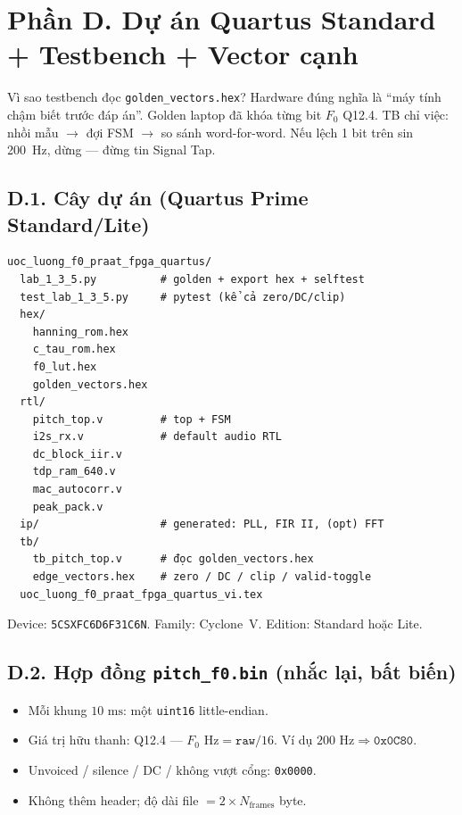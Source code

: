 
\section*{Phần D. Dự án Quartus Standard + Testbench + Vector cạnh}

\begin{firstprin}{Vì sao testbench đọc \texttt{golden\_vectors.hex}?}
Hardware đúng nghĩa là ``máy tính chậm biết trước đáp án''. Golden laptop đã khóa từng bit $F_0$ Q12.4. TB chỉ việc: nhồi mẫu $\to$ đợi FSM $\to$ so sánh word-for-word. Nếu lệch 1 bit trên sin 200~Hz, dừng --- đừng tin Signal Tap.
\end{firstprin}

\subsection*{D.1. Cây dự án (Quartus Prime Standard/Lite)}

\begin{verbatim}
uoc_luong_f0_praat_fpga_quartus/
  lab_1_3_5.py          # golden + export hex + selftest
  test_lab_1_3_5.py     # pytest (kể cả zero/DC/clip)
  hex/
    hanning_rom.hex
    c_tau_rom.hex
    f0_lut.hex
    golden_vectors.hex
  rtl/
    pitch_top.v         # top + FSM
    i2s_rx.v            # default audio RTL
    dc_block_iir.v
    tdp_ram_640.v
    mac_autocorr.v
    peak_pack.v
  ip/                   # generated: PLL, FIR II, (opt) FFT
  tb/
    tb_pitch_top.v      # đọc golden_vectors.hex
    edge_vectors.hex    # zero / DC / clip / valid-toggle
  uoc_luong_f0_praat_fpga_quartus_vi.tex
\end{verbatim}

Device: \texttt{5CSXFC6D6F31C6N}. Family: Cyclone~V. Edition: Standard hoặc Lite.

\subsection*{D.2. Hợp đồng \texttt{pitch\_f0.bin} (nhắc lại, bất biến)}

\begin{itemize}[leftmargin=*,itemsep=1pt]
  \item Mỗi khung $10\text{ ms}$: một \texttt{uint16} little-endian.
  \item Giá trị hữu thanh: Q12.4 --- $F_0\text{ Hz} = \texttt{raw}/16$. Ví dụ $200\text{ Hz}\Rightarrow\texttt{0x0C80}$.
  \item Unvoiced / silence / DC / không vượt cổng: \texttt{0x0000}.
  \item Không thêm header; độ dài file $= 2\times N_{\text{frames}}$ byte.
\end{itemize}

